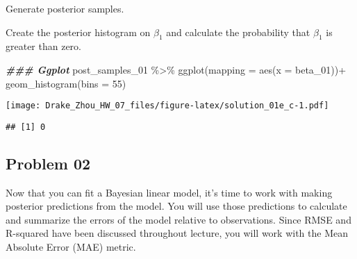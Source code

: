 \documentclass[
]{article}
\newenvironment{Shaded}{\begin{snugshade}}{\end{snugshade}}
\newcommand{\AttributeTok}[1]{\textcolor[rgb]{0.77,0.63,0.00}{#1}}
\newcommand{\DecValTok}[1]{\textcolor[rgb]{0.00,0.00,0.81}{#1}}
\newcommand{\DocumentationTok}[1]{\textcolor[rgb]{0.56,0.35,0.01}{\textbf{\textit{#1}}}}
\newcommand{\FunctionTok}[1]{\textcolor[rgb]{0.00,0.00,0.00}{#1}}
\newcommand{\NormalTok}[1]{#1}
\newcommand{\OtherTok}[1]{\textcolor[rgb]{0.56,0.35,0.01}{#1}}
\newcommand{\SpecialCharTok}[1]{\textcolor[rgb]{0.00,0.00,0.00}{#1}}
\begin{document}
Generate posterior samples.

\begin{Shaded}
\end{Shaded}

Create the posterior histogram on \(\beta_1\) and calculate the
probability that \(\beta_1\) is greater than zero.

\begin{Shaded}
\begin{Highlighting}[]
\DocumentationTok{\#\#\# Ggplot}
\NormalTok{post\_samples\_01 }\SpecialCharTok{\%\textgreater{}\%}
  \FunctionTok{ggplot}\NormalTok{(}\AttributeTok{mapping =} \FunctionTok{aes}\NormalTok{(}\AttributeTok{x =}\NormalTok{ beta\_01))}\SpecialCharTok{+}
  \FunctionTok{geom\_histogram}\NormalTok{(}\AttributeTok{bins =} \DecValTok{55}\NormalTok{)}
\end{Highlighting}
\end{Shaded}

\texttt{[image: Drake\_Zhou\_HW\_07\_files/figure-latex/solution\_01e\_c-1.pdf]}

\begin{Shaded}
\end{Shaded}

\begin{verbatim}
## [1] 0
\end{verbatim}

\hypertarget{problem-02}{%
\subsection{Problem 02}\label{problem-02}}

Now that you can fit a Bayesian linear model, it's time to work with
making posterior predictions from the model. You will use those
predictions to calculate and summarize the errors of the model relative
to observations. Since RMSE and R-squared have been discussed throughout
lecture, you will work with the Mean Absolute Error (MAE) metric.
\end{document}
